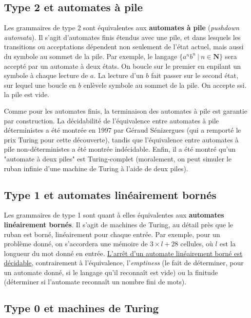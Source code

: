 \subsection{Type 2 et automates à pile}

Les grammaires de type 2 sont équivalentes aux \textbf{automates à pile} (\textit{pushdown automata}). Il s'agit d'automates finis étendus avec une pile, et dans lesquels les transitions ou acceptations dépendent non seulement de l'état actuel, mais aussi du symbole au sommet de la pile. Par exemple, le langage $\{a^nb^n ~|~ n \in \mathbf{N}\}$ sera accepté par un automate à deux états. On boucle sur le premier en enpilant un symbole à chaque lecture de $a$. La lecture d'un $b$ fait passer sur le second état, sur lequel une boucle en $b$ enlèvele symbole au sommet de la pile. On accepte ssi. la pile est vide. 

Comme pour les automates finis, la terminaison des automates à pile est garantie par construction. La décidabilité de l'équivalence entre automates à pile déterministes a été montrée en 1997 par Géraud Sénizergues (qui a remporté le prix Turing pour cette découverte), tandis que l'équivalence entre automates à pile non-déterministes a été montrée indécidable. Enfin, il a été montré qu'un "automate à deux piles" est Turing-complet (moralement, on peut simuler le ruban infinie d'une machine de Turing à l'aide de deux piles). 

\subsection{Type 1 et automates linéairement bornés}

Les grammaires de type 1 sont quant à elles équivalentes aux \textbf{automates linéairement bornés}. Il s'agit de machines de Turing, au détail près que le ruban est borné, linéairement pour chaque entrée. Par exemple, pour un problème donné, on s'accordera une mémoire de $3 \times l + 28$ cellules, où $l$ est la longueur du mot donné en entrée.
\href{https://cs.stackexchange.com/questions/22925/why-is-the-halting-problem-decidable-for-lba}{L'arrêt d'un automate linéairement borné est décidable}, contrairement à l'équivalence, l'\textit{emptiness} (le fait de déterminer, pour un automate donné, si le langage qu'il reconnaît est vide) ou la finitude (déterminer si l'automate reconnaît un nombre fini de mots).

\subsection{Type 0 et machines de Turing}


